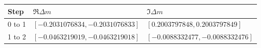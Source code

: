 \begin{tabular}{@{}lll@{}}
\toprule
Step & $\Re\Delta m$ & $\Im\Delta m$ \\
\midrule
0 to 1 & $[-0.2031076834, -0.2031076833]$ & $[0.2003797848, 0.2003797849]$ \\
1 to 2 & $[-0.0463219019, -0.0463219018]$ & $[-0.0088332477, -0.0088332476]$ \\
\bottomrule
\end{tabular}
